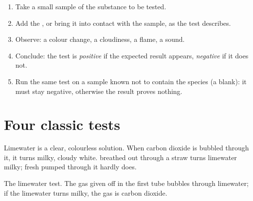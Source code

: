 \begin{method}\label{met:g7:identifying-substances:run}
\begin{enumerate}
  \item Take a small sample of the substance to be tested.
  \item Add the , or bring it into contact with the sample, as
        the test describes.
  \item Observe: a colour change, a cloudiness, a flame, a sound.
  \item Conclude: the test is \emph{positive} if the expected result
        appears, \emph{negative} if it does not.
  \item Run the same test on a sample known not to contain the species
        (a blank): it must stay negative, otherwise the result proves
        nothing.
\end{enumerate}
\end{method}

\section{Four classic tests}

\begin{proposition}\label{prop:g7:identifying-substances:limewater}
Limewater is a clear, colourless solution. When carbon dioxide is
bubbled through it, it turns milky, cloudy white.  breathed out
through a straw turns limewater milky; fresh  pumped through it
hardly does.
\end{proposition}

\begin{omfigure}

{\small The limewater test. The gas given off in the first tube bubbles
through limewater; if the limewater turns milky, the gas is carbon
dioxide.}
\end{omfigure}

